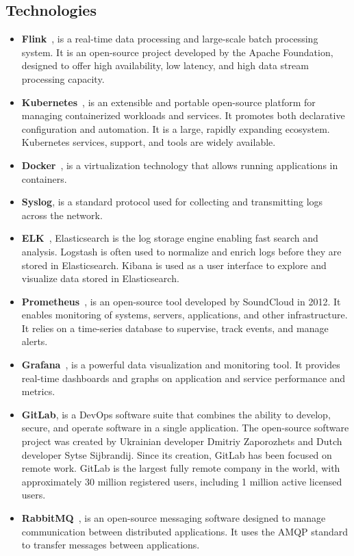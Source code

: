 \subsection{Technologies}

\begin{itemize}
    \item[-] \textbf{Flink}~\cite{FLINK}, is a real-time data processing and large-scale batch processing system. It is an open-source project developed by the Apache Foundation, designed to offer high availability, low latency, and high data stream processing capacity.
    \item[-] \textbf{Kubernetes}~\cite{K8S}, is an extensible and portable open-source platform for managing containerized workloads and services. It promotes both declarative configuration and automation. It is a large, rapidly expanding ecosystem. Kubernetes services, support, and tools are widely available.
    \item[-] \textbf{Docker}~\cite{docker}, is a virtualization technology that allows running applications in containers.
    \item[-] \textbf{Syslog}, is a standard protocol used for collecting and transmitting logs across the network.
    \item[-] \textbf{ELK}~\cite{elk}, Elasticsearch is the log storage engine enabling fast search and analysis. Logstash is often used to normalize and enrich logs before they are stored in Elasticsearch. Kibana is used as a user interface to explore and visualize data stored in Elasticsearch.
    \item[-] \textbf{Prometheus}~\cite{prometheus}, is an open-source tool developed by SoundCloud in 2012. It enables monitoring of systems, servers, applications, and other infrastructure. It relies on a time-series database to supervise, track events, and manage alerts.
    \item[-] \textbf{Grafana}~\cite{grafana}, is a powerful data visualization and monitoring tool. It provides real-time dashboards and graphs on application and service performance and metrics.
    \item[-] \textbf{GitLab}, is a DevOps software suite that combines the ability to develop, secure, and operate software in a single application. The open-source software project was created by Ukrainian developer Dmitriy Zaporozhets and Dutch developer Sytse Sijbrandij. Since its creation, GitLab has been focused on remote work. GitLab is the largest fully remote company in the world, with approximately 30 million registered users, including 1 million active licensed users.
    \item[-] \textbf{RabbitMQ}~\cite{RBMQ}, is an open-source messaging software designed to manage communication between distributed applications. It uses the AMQP standard to transfer messages between applications.
\end{itemize}

